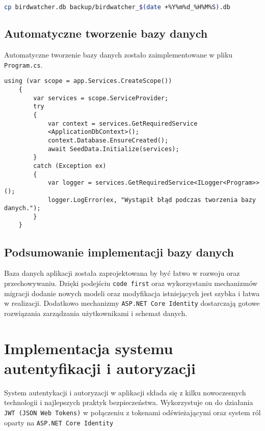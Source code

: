 \begin{lstlisting}[language=bash, caption={Przykład skryptu kopiującego w bash}]
cp birdwatcher.db backup/birdwatcher_$(date +%Y%m%d_%H%M%S).db
\end{lstlisting}

\subsection{Automatyczne tworzenie bazy danych}
Automatyczne tworzenie bazy danych zostało zaimplementowane w pliku \texttt{Program.cs}.

\begin{lstlisting}[style=csharp, caption={Automatyczne tworzenie bazy danych}]
using (var scope = app.Services.CreateScope())
	{
		var services = scope.ServiceProvider;
		try
		{
			var context = services.GetRequiredService
			<ApplicationDbContext>();
			context.Database.EnsureCreated();
			await SeedData.Initialize(services);
		}
		catch (Exception ex)
		{
			var logger = services.GetRequiredService<ILogger<Program>>();
			logger.LogError(ex, "Wystąpił błąd podczas tworzenia bazy danych.");
		}
	}
\end{lstlisting}

\subsection{Podsumowanie implementacji bazy danych}
Baza danych aplikacji została zaprojektowana by być łatwo w rozwoju oraz przechowywaniu. Dzięki podejściu \texttt{code first} oraz wykorzystaniu mechanizmów migracji dodanie nowych modeli oraz modyfikacja istniejących jest szybka i łatwa w realizacji. Dodatkowo mechanizmy \texttt{ASP.NET Core Identity} dostarczają gotowe rozwiązania zarządzania użytkownikami i schemat danych.

\FloatBarrier

\section{Implementacja systemu autentyfikacji i autoryzacji}
System autentykacji i autoryzacji w aplikacji składa się z kilku nowoczesnych technologii i najlepszych praktyk bezpieczeństwa. Wykorzystuje on do działania \texttt{JWT (JSON Web Tokens)} w połączeniu z tokenami odświeżającymi oraz system ról oparty na \texttt{ASP.NET Core Identity}

